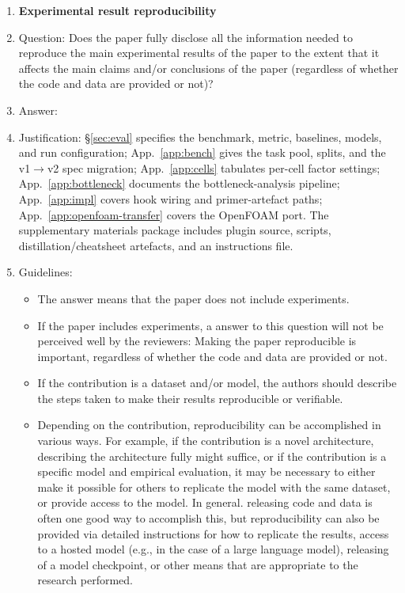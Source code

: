 \begin{enumerate}
    \item {\bf Experimental result reproducibility}
    \item[] Question: Does the paper fully disclose all the information needed to reproduce the main experimental results of the paper to the extent that it affects the main claims and/or conclusions of the paper (regardless of whether the code and data are provided or not)?
    \item[] Answer: \answerYes{}
    \item[] Justification: \S\ref{sec:eval} specifies the benchmark, metric, baselines, models, and run configuration; App.~\ref{app:bench} gives the task pool, splits, and the v1$\to$v2 spec migration; App.~\ref{app:cells} tabulates per-cell factor settings; App.~\ref{app:bottleneck} documents the bottleneck-analysis pipeline; App.~\ref{app:impl} covers hook wiring and primer-artefact paths; App.~\ref{app:openfoam-transfer} covers the OpenFOAM port. The supplementary materials package includes plugin source, scripts, distillation/cheatsheet artefacts, and an instructions file.
    \item[] Guidelines:
    \begin{itemize}
        \item The answer \answerNA{} means that the paper does not include experiments.
        \item If the paper includes experiments, a \answerNo{} answer to this question will not be perceived well by the reviewers: Making the paper reproducible is important, regardless of whether the code and data are provided or not.
        \item If the contribution is a dataset and\slash or model, the authors should describe the steps taken to make their results reproducible or verifiable.
        \item Depending on the contribution, reproducibility can be accomplished in various ways. For example, if the contribution is a novel architecture, describing the architecture fully might suffice, or if the contribution is a specific model and empirical evaluation, it may be necessary to either make it possible for others to replicate the model with the same dataset, or provide access to the model. In general. releasing code and data is often one good way to accomplish this, but reproducibility can also be provided via detailed instructions for how to replicate the results, access to a hosted model (e.g., in the case of a large language model), releasing of a model checkpoint, or other means that are appropriate to the research performed.

\end{itemize}
\end{enumerate}
